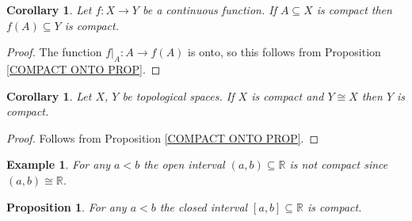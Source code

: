 \documentclass[11pt, letterpaper, oneside]{report}
\theoremstyle{pplain}
\newtheorem{proposition}[theorem]{Proposition}
\newtheorem{corollary}[theorem]{Corollary}
\newtheorem{ITERMVALUE THM}[theorem]{Intermediate Value Theorem}
\newtheorem{HEINEBOREL THM}[theorem]{Heine-Borel Theorem}
\newtheorem{UMETR THM}[theorem]{Urysohn Metrization Theorem}
\newtheorem{UMETR2 THM}[theorem]{Urysohn Metrization Theorem (v.2)}
\theoremstyle{ddefinition}
\newtheorem{example}[theorem]{Example}
\theoremstyle{nnn}
\newtheorem{TDA NN}[theorem]{Topological Data Analysis. }
\theoremstyle{eexercise}
\newcommand{\R}{{\mathbb R}}
\begin{document}
\begin{corollary}
\label{COMPACT IMAGE COR}
Let $f\colon X\to Y$ be a continuous function. If  $A\subseteq X$ is compact  then $f(A)\subseteq Y$ is compact. 
\end{corollary}

\begin{proof}
The function $f|_{A}\colon A \to f(A)$ is onto, so this follows from Proposition \ref{COMPACT ONTO PROP}.
\end{proof}

\begin{corollary}
\label{COMP TOP INV PROP}
Let $X$, $Y$ be topological spaces.
If $X$ is  compact  and $Y \cong X$ then $Y$ is compact. 
\end{corollary}

\begin{proof}
Follows from Proposition \ref{COMPACT ONTO PROP}.
\end{proof}


\begin{example}
For any $a< b$ the open interval $(a, b)\subseteq \R$ is not compact since $(a, b)\cong \R$. 
\end{example}




\begin{proposition}
\label{CLOSEDINT COMPACT PROP}
For any $a< b$ the closed interval $[a, b]\subseteq \R$ is compact.  
\end{proposition}
\end{document}
